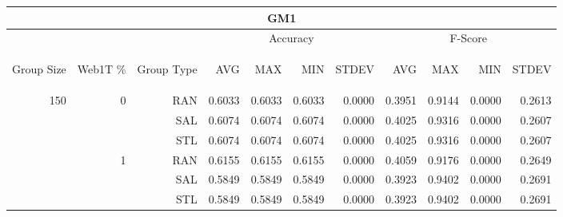 \begin{center}
\begin{table}[htbp]
\begin{tabular}{ | r | r | r | r | r | r | r | r | r | r | r |}
\hline
\multicolumn{11}{|c|}{GM1}\\
\hline
 & & & \multicolumn{4}{|c|}{Accuracy} & \multicolumn{4}{|c|}{F-Score}\\ \cline{4-11}
\begin{sideways}Group Size\end{sideways} & \begin{sideways}Web1T \%\end{sideways} & \begin{sideways}Group Type\end{sideways} & \begin{sideways}AVG\end{sideways} & \begin{sideways}MAX\end{sideways} & \begin{sideways}MIN\end{sideways} & \begin{sideways}STDEV\end{sideways} & \begin{sideways}AVG\end{sideways} & \begin{sideways}MAX\end{sideways} & \begin{sideways}MIN\end{sideways} & \begin{sideways}STDEV\end{sideways}\\
\hline
\multirow{18}{*}{150}
 & \multirow{3}{*}{0} & RAN & 0.6033 & 0.6033 & 0.6033 & 0.0000 & 0.3951 & 0.9144 & 0.0000 & 0.2613\\ \cline{3-11}
 &   & SAL & 0.6074 & 0.6074 & 0.6074 & 0.0000 & 0.4025 & 0.9316 & 0.0000 & 0.2607\\ \cline{3-11}
 &   & STL & 0.6074 & 0.6074 & 0.6074 & 0.0000 & 0.4025 & 0.9316 & 0.0000 & 0.2607\\ \cline{2-11}
 & \multirow{3}{*}{1} & RAN & 0.6155 & 0.6155 & 0.6155 & 0.0000 & 0.4059 & 0.9176 & 0.0000 & 0.2649\\ \cline{3-11}
 &   & SAL & 0.5849 & 0.5849 & 0.5849 & 0.0000 & 0.3923 & 0.9402 & 0.0000 & 0.2691\\ \cline{3-11}
 &   & STL & 0.5849 & 0.5849 & 0.5849 & 0.0000 & 0.3923 & 0.9402 & 0.0000 & 0.2691\\ \cline{2-11}

\end{tabular}
\end{table}
\end{center}
